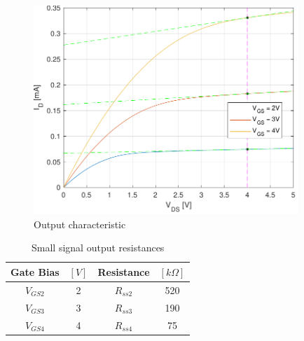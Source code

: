 \documentclass[11pt,a4paper]{article}
\begin{document}
	\begin{figure}
		\centering
		\includegraphics[width=100mm]{output_curves}
		\caption{Output characteristic}
		\label{outputcurve}
	\end{figure}
	\begin{table}
		\caption{Small signal output resistances}
		\centering
		\begin{tabular}[H]{|| c | c | c | c ||}
			\hline
			Gate Bias & $[V]$ & Resistance & $[k\Omega]$ \\ [0.5ex] 
			\hline\hline
			$V_{GS2}$ & 2 & $R_{ss2}$& 520\\
			\hline
			$V_{GS3}$ & 3 & $R_{ss3}$& 190\\
			\hline
			$V_{GS4}$ & 4 & $R_{ss4}$& 75\\
			\hline			
		\end{tabular}
		\label{resistances}
	\end{table}
\end{document}
